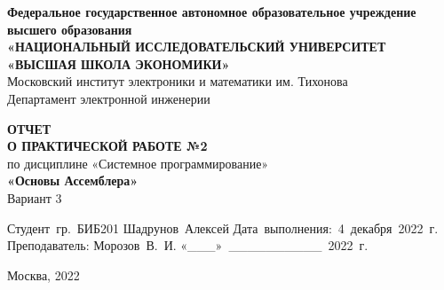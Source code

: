 
\begin{titlepage}
    \begin{Times}
        \begin{center}

            {\large\bf Федеральное‌ ‌государственное‌ ‌автономное‌ ‌образовательное‌ ‌учреждение‌ ‌высшего‌ образования\\}
            {\large\bf «НАЦИОНАЛЬНЫЙ‌ ‌ИССЛЕДОВАТЕЛЬСКИЙ‌ ‌УНИВЕРСИТЕТ‌ «ВЫСШАЯ‌ ‌ШКОЛА‌ ‌ЭКОНОМИКИ»‌\\}
            Московский‌ ‌институт‌ ‌электроники‌ ‌и‌ ‌математики‌ ‌им. Тихонова‌\\
            Департамент‌ ‌электронной‌ ‌инженерии‌\\

            \vfill
            \vfill

            {\bf ОТЧЕТ \\
                О ПРАКТИЧЕСКОЙ РАБОТЕ №2}\\
            по дисциплине «Системное программирование»\\
            {\bf«Основы Ассемблера»}\\
            Вариант 3\\


            \vfill
            \vfill
            \vfill

            \hfill\vbox
            {
                \hbox{Студент гр. БИБ201}
                \hbox{Шадрунов Алексей}
                \hbox{Дата выполнения: 4 декабря 2022 г.}
                \hbox{}
                \hbox{Преподаватель:}
                \hbox{Морозов В. И.}
                \hbox{«\_\_\_» \_\_\_\_\_\_\_\_\_\_ 2022 г.}
            }

            \vfill

            Москва, 2022
        \end{center}
    \end{Times}

\end{titlepage}
